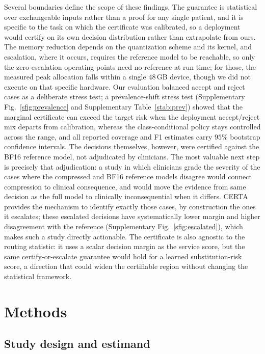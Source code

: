 \documentclass[pdflatex,sn-mathphys-num]{sn-jnl}%
\theoremstyle{thmstyleone}%
\theoremstyle{thmstyletwo}%
\theoremstyle{thmstylethree}%
\begin{document}
Several boundaries define the scope of these findings. The guarantee is statistical over
exchangeable inputs rather than a proof for any single patient, and it is specific to the task on
which the certificate was calibrated, so a deployment would certify on its own decision distribution
rather than extrapolate from ours. The memory reduction depends on the quantization scheme and its
kernel, and escalation, where it occurs, requires the reference model to be reachable, so only the
zero-escalation operating points need no reference at run time; for those, the measured peak allocation
falls within a single $48$\,GB device, though we did not execute on that specific hardware. Our evaluation balanced
accept and reject cases as a deliberate stress test; a prevalence-shift stress test (Supplementary
Fig.~\ref{sfig:prevalence} and Supplementary Table~\ref{stab:prev}) showed that the marginal
certificate can exceed the target risk when the deployment accept/reject mix departs from
calibration, whereas the class-conditional policy stays controlled across the range, and all reported
coverage and F1 estimates carry $95\%$ bootstrap confidence intervals. The decisions themselves, however, were certified
against the BF16 reference model, not adjudicated by clinicians. The most valuable next step is precisely that adjudication: a study in which clinicians
grade the severity of the cases where the compressed and BF16 reference models disagree would connect
compression to clinical consequence, and would move the evidence from same decision as the full
model to clinically inconsequential when it differs. CERTA provides the mechanism to identify exactly
those cases, by construction the ones it escalates; these escalated decisions have systematically
lower margin and higher disagreement with the reference (Supplementary Fig.~\ref{sfig:escalated}),
which makes such a study directly actionable. The certificate is also agnostic to the routing statistic:
it uses a scalar decision margin as the service score, but the same certify-or-escalate guarantee would
hold for a learned substitution-risk score, a direction that could widen the certifiable region without
changing the statistical framework.



\section*{Methods}

\subsection*{Study design and estimand}
 
\end{document}
